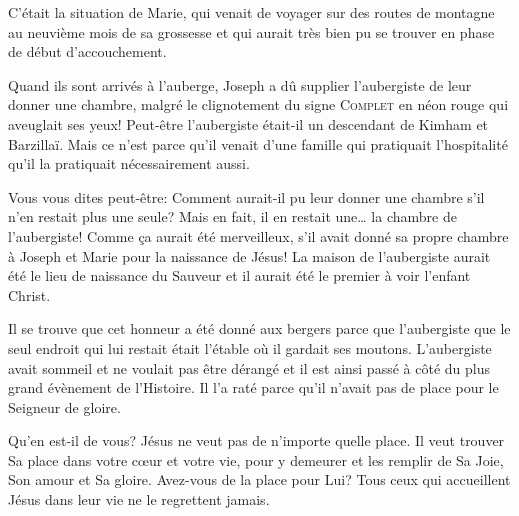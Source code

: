 C'était la situation de Marie, qui venait de voyager sur des routes de montagne au neuvième mois de sa grossesse et qui aurait très bien pu se trouver en phase de début d'accouchement.

Quand ils sont arrivés à l'auberge, Joseph a dû supplier l'aubergiste de leur donner une chambre, malgré le clignotement du signe \textsc{Complet} en néon rouge qui aveuglait ses yeux! Peut-être l'aubergiste était-il un descendant de Kimham et Barzillaï. Mais ce n'est parce qu'il venait d'une famille qui pratiquait l'hospitalité qu'il la pratiquait nécessairement aussi.

Vous vous dites peut-être: \og Comment aurait-il pu leur donner une chambre s'il n'en restait plus une seule? \fg{} Mais en fait, il en restait une… la chambre de l'aubergiste! Comme ça aurait été merveilleux, s'il avait donné sa propre chambre à Joseph et Marie pour la naissance de Jésus! La maison de l'aubergiste aurait été le lieu de naissance du Sauveur et il aurait été le premier à voir l'enfant Christ.

Il se trouve que cet honneur a été donné aux bergers parce que l'aubergiste que le seul endroit qui lui restait était l'étable où il gardait ses moutons. L'aubergiste avait sommeil et ne voulait pas être dérangé et il est ainsi passé à côté du plus grand évènement de l'Histoire. Il l'a raté parce qu'il n'avait pas de place pour le Seigneur de gloire.

Qu'en est-il de vous? Jésus ne veut pas de n'importe quelle place. Il veut trouver Sa place dans votre cœur et votre vie, pour y demeurer et les remplir de Sa Joie, Son amour et Sa gloire. Avez-vous de la place pour Lui? Tous ceux qui accueillent Jésus dans leur vie ne le regrettent jamais.



\ornrule


